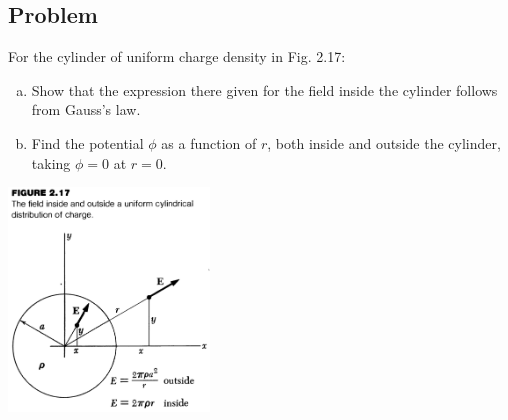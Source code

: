 \documentclass[solutions]{esg8022pset}
\begin{document}
\subsection{Problem}
  For the cylinder of uniform charge density in Fig. 2.17:
  \begin{enumerate}[(a)]
    \item Show that the expression there given for the field inside the cylinder follows from Gauss's law.
    \item Find the potential $\phi$ as a function of $r$, both inside and outside the cylinder, taking $\phi = 0$ at $r = 0$.
  \end{enumerate}
  \begin{center}\includegraphics[width=0.4\textwidth]{ps02_2}\end{center}
\end{document}
